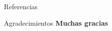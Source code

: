\documentclass[10pt]{beamer}
\begin{document}
\begin{frame}{Referencias}
    \printbibliography
\end{frame}

\begin{frame}{Agradecimientos}
    \centering
    \Huge \textbf{Muchas gracias}
\end{frame}
\end{document}
